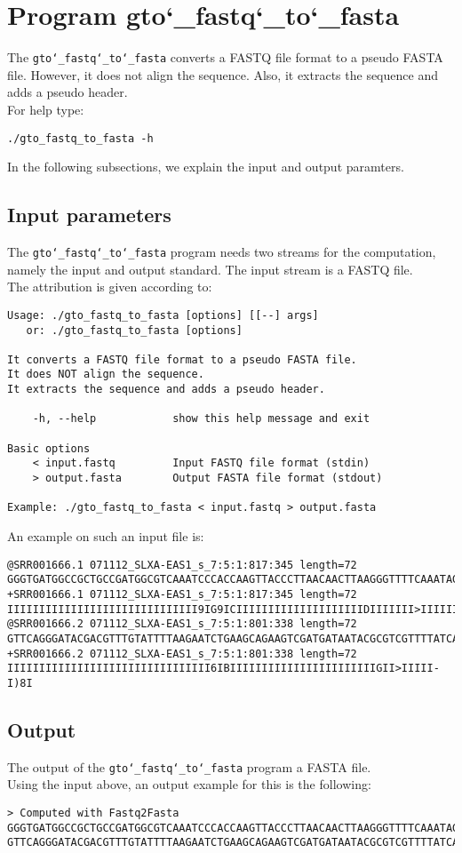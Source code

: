 \section{Program gto\char`_fastq\char`_to\char`_fasta}
The \texttt{gto\char`_fastq\char`_to\char`_fasta} converts a FASTQ file format to a pseudo FASTA file. However, it does not align the sequence. Also, it extracts the sequence and adds a pseudo header.\\
For help type:
\begin{lstlisting}
./gto_fastq_to_fasta -h
\end{lstlisting}
In the following subsections, we explain the input and output paramters.

\subsection*{Input parameters}

The \texttt{gto\char`_fastq\char`_to\char`_fasta} program needs two streams for the computation, namely the input and output standard. The input stream is a FASTQ file.\\
The attribution is given according to:
\begin{lstlisting}
Usage: ./gto_fastq_to_fasta [options] [[--] args]
   or: ./gto_fastq_to_fasta [options]

It converts a FASTQ file format to a pseudo FASTA file.
It does NOT align the sequence.
It extracts the sequence and adds a pseudo header.

    -h, --help            show this help message and exit

Basic options
    < input.fastq         Input FASTQ file format (stdin)
    > output.fasta        Output FASTA file format (stdout)

Example: ./gto_fastq_to_fasta < input.fastq > output.fasta
\end{lstlisting}
An example on such an input file is:
\begin{lstlisting}
@SRR001666.1 071112_SLXA-EAS1_s_7:5:1:817:345 length=72
GGGTGATGGCCGCTGCCGATGGCGTCAAATCCCACCAAGTTACCCTTAACAACTTAAGGGTTTTCAAATAGA
+SRR001666.1 071112_SLXA-EAS1_s_7:5:1:817:345 length=72
IIIIIIIIIIIIIIIIIIIIIIIIIIIIII9IG9ICIIIIIIIIIIIIIIIIIIIIDIIIIIII>IIIIII/
@SRR001666.2 071112_SLXA-EAS1_s_7:5:1:801:338 length=72
GTTCAGGGATACGACGTTTGTATTTTAAGAATCTGAAGCAGAAGTCGATGATAATACGCGTCGTTTTATCAT
+SRR001666.2 071112_SLXA-EAS1_s_7:5:1:801:338 length=72
IIIIIIIIIIIIIIIIIIIIIIIIIIIIIIII6IBIIIIIIIIIIIIIIIIIIIIIIIGII>IIIII-I)8I
\end{lstlisting}

\subsection*{Output}
The output of the \texttt{gto\char`_fastq\char`_to\char`_fasta} program a FASTA file.\\
Using the input above, an output example for this is the following:
\begin{lstlisting}
> Computed with Fastq2Fasta
GGGTGATGGCCGCTGCCGATGGCGTCAAATCCCACCAAGTTACCCTTAACAACTTAAGGGTTTTCAAATAGA
GTTCAGGGATACGACGTTTGTATTTTAAGAATCTGAAGCAGAAGTCGATGATAATACGCGTCGTTTTATCAT
\end{lstlisting}
